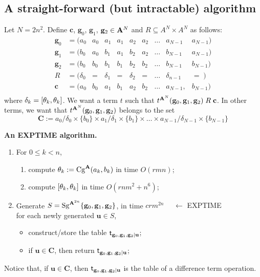     \subsection{A straight-forward (but intractable) algorithm}
    Let $N = 2n^2$.  Define $\mathbf{c}$, $\mathbf{g}_0$, $\mathbf{g}_1$, $\mathbf{g}_2 \in \mathbf{A}^{N}$ 
    and $R \subseteq A^{N}\times A^{N}$ as follows:
    \begin{equation}
    \begin{array}{cccccccccc}
      \mathbf{g}_0 &= (a_0 & a_0 &a_1 &a_1 &a_2 &a_2 & \dots & a_{N-1} & a_{N-1}) \\
      \mathbf{g}_1 &= (b_0 & a_0 &b_1 &a_1 &b_2 &a_2 & \dots & b_{N-1} & a_{N-1}) \\
      \mathbf{g}_2 &= (b_0 & b_0 &b_1 &b_1 &b_2 &b_2 & \dots & b_{N-1} & b_{N-1})\\[4pt]
        R  & = (\delta_0 & =  & \delta_1 & = & \delta_2 & = & \dots  & \delta_{n-1} & = \; )\\ [4pt]
      \mathbf{c}            & = (a_0     & b_0       & a_1      & b_1      & a_2      & b_2      & \dots  & a_{N-1}, & b_{N-1}) \\
    \end{array}
    \end{equation}
    where $\delta_k= [\theta_k, \theta_k]$.  We want a term $t$ such that $t^{\mathbf{A}^{N}}(\mathbf{g}_0, \mathbf{g}_1, \mathbf{g}_2)\mathrel{R} \mathbf{c}$.
    In other terms, we want that $t^{\mathbf{A}^{N}}(\mathbf{g}_0, \mathbf{g}_1, \mathbf{g}_2)$ belongs to the set
    \[
    \mathbf{C} := a_0/\delta_0 \times \{b_0\} \times a_1/\delta_1 \times \{b_1\} \times   \dots \times a_{N-1}/\delta_{N-1} \times \{b_{N-1}\}
    \]
    
    \noindent \textbf{An {\small EXPTIME} algorithm.}
     \begin{enumerate}
       \item For $0\leq k < n$,
       \begin{enumerate}
         \item compute $\theta_k:= \operatorname{Cg}^{\mathbf{A}}(a_k, b_k)$ in time $O(rmn)$;
         \item compute $[ \theta_k ,  \theta_k ]$ in time $O(rnm^2 + n^6)$;
       \end{enumerate}
    \item Generate $S=\operatorname{Sg}^{\mathbf{A}^{2n}} \{\mathbf{g}_0, \mathbf{g}_1, \mathbf{g}_2\}$,
      in time $c r m^{2n}$ {\tiny {\color{red} $\quad \leftarrow$ EXPTIME}}\\
    for each newly generated $\mathbf{u} \in S$, 
      \begin{itemize}
      \item construct/store the table
        $\mathsf{t}_{\mathbf{g}_0, \mathbf{g}_1, \mathbf{g}_2|\mathbf{u}}$;
      \item if $\mathbf{u} \in \mathbf{C}$, then return     $\mathsf{t}_{\mathbf{g}_0, \mathbf{g}_1, \mathbf{g}_2|\mathbf{u}}$;
      \end{itemize}
    \end{enumerate}
    Notice that, if $\mathbf{u} \in \mathbf{C}$, then $\mathsf{t}_{\mathbf{g}_0, \mathbf{g}_1, \mathbf{g}_2|\mathbf{u}}$  is the table of a difference term operation.
    
